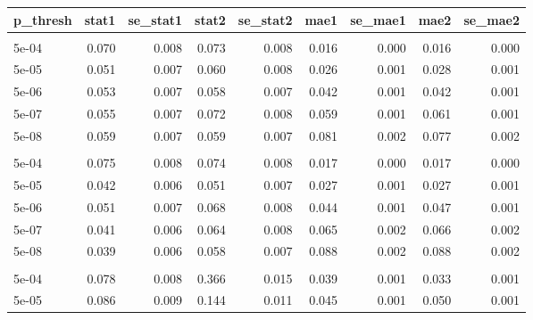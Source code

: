 \documentclass{article}
\begin{document}
\newpage
\begin{table}[H]\label{supptable1}
\centering
\begin{tabular}{lrrrrrrrr}
\toprule
p\_thresh & stat1 & se\_stat1 & stat2 & se\_stat2 & mae1 & se\_mae1 & mae2 & se\_mae2\\
\midrule
\addlinespace[0.3em]
\multicolumn{9}{l}{\textbf{Null: Uncorrelated pleiotropy}}\\
\hspace{1em}5e-04 & 0.070 & 0.008 & 0.073 & 0.008 & 0.016 & 0.000 & 0.016 & 0.000\\
\hspace{1em}5e-05 & 0.051 & 0.007 & 0.060 & 0.008 & 0.026 & 0.001 & 0.028 & 0.001\\
\hspace{1em}5e-06 & 0.053 & 0.007 & 0.058 & 0.007 & 0.042 & 0.001 & 0.042 & 0.001\\
\hspace{1em}5e-07 & 0.055 & 0.007 & 0.072 & 0.008 & 0.059 & 0.001 & 0.061 & 0.001\\
\hspace{1em}5e-08 & 0.059 & 0.007 & 0.059 & 0.007 & 0.081 & 0.002 & 0.077 & 0.002\\
\addlinespace[0.3em]
\multicolumn{9}{l}{\textbf{Null: Correlated pleiotropy}}\\
\hspace{1em}5e-04 & 0.075 & 0.008 & 0.074 & 0.008 & 0.017 & 0.000 & 0.017 & 0.000\\
\hspace{1em}5e-05 & 0.042 & 0.006 & 0.051 & 0.007 & 0.027 & 0.001 & 0.027 & 0.001\\
\hspace{1em}5e-06 & 0.051 & 0.007 & 0.068 & 0.008 & 0.044 & 0.001 & 0.047 & 0.001\\
\hspace{1em}5e-07 & 0.041 & 0.006 & 0.064 & 0.008 & 0.065 & 0.002 & 0.066 & 0.002\\
\hspace{1em}5e-08 & 0.039 & 0.006 & 0.058 & 0.007 & 0.088 & 0.002 & 0.088 & 0.002\\
\addlinespace[0.3em]
\multicolumn{9}{l}{\textbf{Null: Correlated pleiotropy, unequal power}}\\
\hspace{1em}5e-04 & 0.078 & 0.008 & 0.366 & 0.015 & 0.039 & 0.001 & 0.033 & 0.001\\
\hspace{1em}5e-05 & 0.086 & 0.009 & 0.144 & 0.011 & 0.045 & 0.001 & 0.050 & 0.001\\

\end{tabular}
\end{table}
\end{document}
